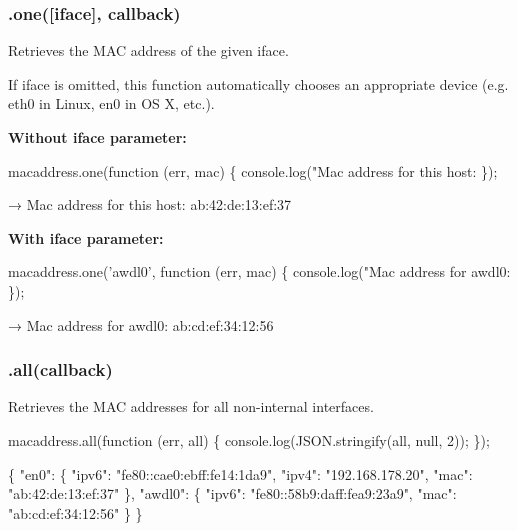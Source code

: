 \subsubsection*{{\ttfamily .one(\mbox{[}iface\mbox{]}, callback)}}

Retrieves the M\+AC address of the given {\ttfamily iface}.

If {\ttfamily iface} is omitted, this function automatically chooses an appropriate device (e.\+g. {\ttfamily eth0} in Linux, {\ttfamily en0} in OS X, etc.).

{\bfseries Without {\ttfamily iface} parameter\+:}


\begin{DoxyCode}
macaddress.one(function (err, mac) \{
  console.log("Mac address for this host: %
\});
\end{DoxyCode}



\begin{DoxyCode}
→ Mac address for this host: ab:42:de:13:ef:37
\end{DoxyCode}


{\bfseries With {\ttfamily iface} parameter\+:}


\begin{DoxyCode}
macaddress.one('awdl0', function (err, mac) \{
  console.log("Mac address for awdl0: %
\});
\end{DoxyCode}



\begin{DoxyCode}
→ Mac address for awdl0: ab:cd:ef:34:12:56
\end{DoxyCode}
 



\subsubsection*{{\ttfamily .all(callback)}}

Retrieves the M\+AC addresses for all non-\/internal interfaces.


\begin{DoxyCode}
macaddress.all(function (err, all) \{
  console.log(JSON.stringify(all, null, 2));
\});
\end{DoxyCode}



\begin{DoxyCode}
\{
  "en0": \{
    "ipv6": "fe80::cae0:ebff:fe14:1da9",
    "ipv4": "192.168.178.20",
    "mac": "ab:42:de:13:ef:37"
  \},
  "awdl0": \{
    "ipv6": "fe80::58b9:daff:fea9:23a9",
    "mac": "ab:cd:ef:34:12:56"
  \}
\}
\end{DoxyCode}
 



